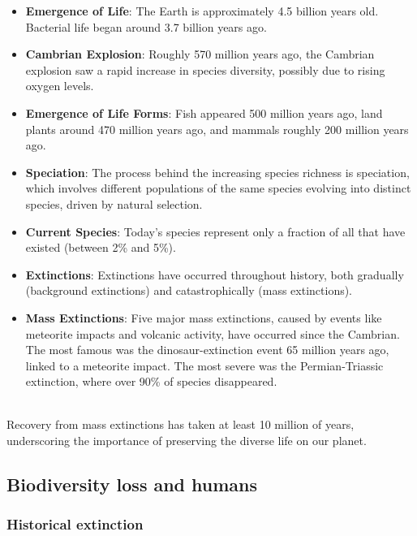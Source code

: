 \documentclass[../summary.tex]{subfiles}
\begin{document}
\begin{itemize}
	\item \textbf{Emergence of Life}: The Earth is approximately 4.5 billion years old. Bacterial life began around 3.7 billion years ago.
	\item \textbf{Cambrian Explosion}: Roughly 570 million years ago, the Cambrian explosion saw a rapid increase in species diversity, possibly due to rising oxygen levels.
	\item \textbf{Emergence of Life Forms}: Fish appeared 500 million years ago, land plants around 470 million years ago, and mammals roughly 200 million years ago.
	\item \textbf{Speciation}: The process behind the increasing species richness is speciation, which involves different populations of the same species evolving into distinct species, driven by natural selection.
	\item \textbf{Current Species}: Today's species represent only a fraction of all that have existed (between 2\% and 5\%).
	\item \textbf{Extinctions}: Extinctions have occurred throughout history, both gradually (background extinctions) and catastrophically (mass extinctions).
	\item \textbf{Mass Extinctions}: Five major mass extinctions, caused by events like meteorite impacts and volcanic activity, have occurred since the Cambrian. The most famous was the dinosaur-extinction event 65 million years ago, linked to a meteorite impact. The most severe was the Permian-Triassic extinction, where over 90\% of species disappeared.
\end{itemize}
\ \\
Recovery from mass extinctions has taken at least 10 million of years, underscoring the importance of preserving the diverse life on our planet.
\newpage

\subsection{Biodiversity loss and humans}
\subsubsection{Historical extinction}
\end{document}
